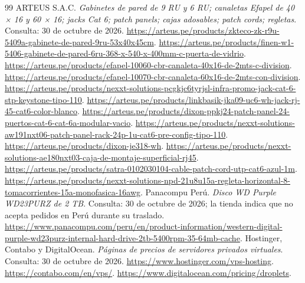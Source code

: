 \begin{thebibliography}{99}
 ARTEUS S.A.C. \emph{Gabinetes de pared de 9 RU y 6 RU; canaletas Efapel de 40 × 16 y 60 × 16; jacks Cat 6; patch panels; cajas adosables; patch cords; regletas}. Consulta: 30 de octubre de 2026. \url{https://arteus.pe/products/zkteco-zk-r9u-5409a-gabinete-de-pared-9ru-53x40x45cm}. \url{https://arteus.pe/products/finen-w1-5406-gabinete-de-pared-6ru-368-x-540-x-400mm-c-puerta-de-vidrio}. \url{https://arteus.pe/products/efapel-10060-cbr-canaleta-40x16-de-2mts-c-division}. \url{https://arteus.pe/products/efapel-10070-cbr-canaleta-60x16-de-2mts-con-division}. \url{https://arteus.pe/products/nexxt-solutions-pcgkjc6tyrjsl-infra-promo-jack-cat-6-stp-keystone-tipo-110}. \url{https://arteus.pe/products/linkbasik-jka09-uc6-wh-jack-rj-45-cat6-color-blanco}. \url{https://arteus.pe/products/dixon-ppkj24-patch-panel-24-puertos-cat-6-cat-6a-modular-vacio}. \url{https://arteus.pe/products/nexxt-solutions-aw191nxt06-patch-panel-rack-24p-1u-cat6-pre-config-tipo-110}. \url{https://arteus.pe/products/dixon-je318-wh}. \url{https://arteus.pe/products/nexxt-solutions-ae180nxt03-caja-de-montaje-superficial-rj45}. \url{https://arteus.pe/products/satra-0102030104-cable-patch-cord-utp-cat6-azul-1m}. \url{https://arteus.pe/products/nexxt-solutions-npd-21u8u15a-regleta-horizontal-8-tomacorrientes-15a-monofasica-16awg}.
 Panacompu Perú. \emph{Disco WD Purple WD23PURZ de 2 TB}. Consulta: 30 de octubre de 2026; la tienda indica que no acepta pedidos en Perú durante su traslado. \url{https://www.panacompu.com/peru/en/product-information/western-digital-purple-wd23purz-internal-hard-drive-2tb-5400rpm-35-64mb-cache}.
 Hostinger, Contabo y DigitalOcean. \emph{Páginas de precios de servidores privados virtuales}. Consulta: 30 de octubre de 2026. \url{https://www.hostinger.com/vps-hosting}. \url{https://contabo.com/en/vps/}. \url{https://www.digitalocean.com/pricing/droplets}.
\end{thebibliography}\endgroup
